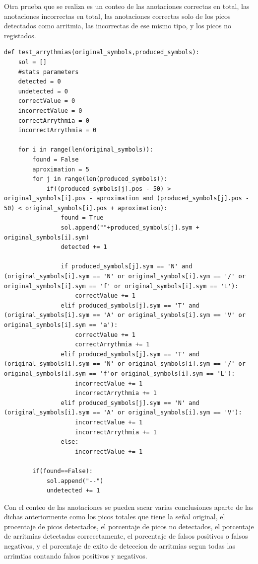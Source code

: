 Otra prueba que se realiza es un conteo de las anotaciones correctas en total, las anotaciones incorrectas en total, las anotaciones
correctas solo de los picos detectados como arritmia, las incorrectas de ese mismo tipo, y los picos no registados. 

\lstset{language=python, breaklines=true, basicstyle=\footnotesize}
\begin{lstlisting}[frame=single]
def test_arrythmias(original_symbols,produced_symbols):
    sol = []
    #stats parameters
    detected = 0
    undetected = 0
    correctValue = 0
    incorrectValue = 0
    correctArrythmia = 0
    incorrectArrythmia = 0
    
    for i in range(len(original_symbols)):
        found = False
        aproximation = 5
        for j in range(len(produced_symbols)):
            if((produced_symbols[j].pos - 50) > original_symbols[i].pos - aproximation and (produced_symbols[j].pos - 50) < original_symbols[i].pos + aproximation):
                found = True
                sol.append(""+produced_symbols[j].sym + original_symbols[i].sym)
                detected += 1
                
                if produced_symbols[j].sym == 'N' and (original_symbols[i].sym == 'N' or original_symbols[i].sym == '/' or original_symbols[i].sym == 'f' or original_symbols[i].sym == 'L'):
                    correctValue += 1
                elif produced_symbols[j].sym == 'T' and (original_symbols[i].sym == 'A' or original_symbols[i].sym == 'V' or original_symbols[i].sym == 'a'):
                    correctValue += 1
                    correctArrythmia += 1
                elif produced_symbols[j].sym == 'T' and (original_symbols[i].sym == 'N' or original_symbols[i].sym == '/' or original_symbols[i].sym == 'f'or original_symbols[i].sym == 'L'):
                    incorrectValue += 1
                    incorrectArrythmia += 1
                elif produced_symbols[j].sym == 'N' and (original_symbols[i].sym == 'A' or original_symbols[i].sym == 'V'):
                    incorrectValue += 1
                    incorrectArrythmia += 1
                else:
                    incorrectValue += 1
                
        if(found==False):
            sol.append("--")
            undetected += 1
\end{lstlisting}

Con el conteo de las anotaciones se pueden sacar varias conclusiones aparte de las dichas 
anteriormente como los picos totales que tiene la señal original, el procentaje de picos 
detectados, el porcentaje de picos no detectados, el porcentaje de arritmias detectadas 
correcetamente, el porcentaje de falsos positivos o falsos negativos, y el porcentaje de exito de deteccion de 
arritmias segun todas las arrimtias contando falsos positivos y negativos.

